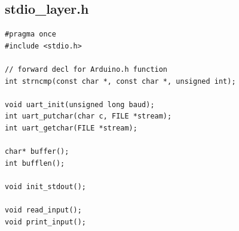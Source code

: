 \documentclass[12pt,a4paper]{article}
\begin{document}
\subsection{stdio\_layer.h}
\begin{lstlisting}
#pragma once
#include <stdio.h>

// forward decl for Arduino.h function
int strncmp(const char *, const char *, unsigned int);

void uart_init(unsigned long baud);
int uart_putchar(char c, FILE *stream);
int uart_getchar(FILE *stream);

char* buffer();
int bufflen();

void init_stdout();

void read_input();
void print_input();
\end{lstlisting}
\end{document}
